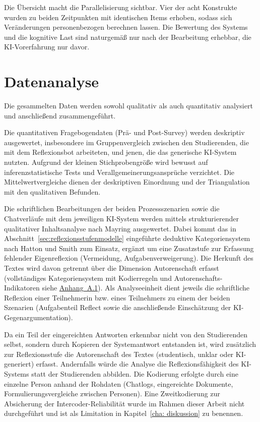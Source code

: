 Die Übersicht macht die Parallelisierung sichtbar. Vier der acht Konstrukte wurden zu beiden
Zeitpunkten mit identischen Items erhoben, sodass sich Veränderungen personenbezogen berechnen
lassen. Die Bewertung des Systems und die kognitive Last sind naturgemäß nur nach der Bearbeitung
erhebbar, die KI-Vorerfahrung nur davor.

\newpage
\section{Datenanalyse}
\label{sec:datenanalyse}
Die gesammelten Daten werden sowohl qualitativ als auch quantitativ analysiert und anschließend
zusammengeführt.

Die quantitativen Fragebogendaten (Prä- und Post-Survey) werden deskriptiv ausgewertet, insbesondere
im Gruppenvergleich zwischen den Studierenden, die mit dem Reflexionsbot arbeiteten, und jenen, die
das generische KI-System nutzten. Aufgrund der kleinen Stichprobengröße wird bewusst auf
inferenzstatistische Tests und Verallgemeinerungsansprüche verzichtet. Die Mittelwertvergleiche dienen
der deskriptiven Einordnung und der Triangulation mit den qualitativen Befunden.

Die schriftlichen Bearbeitungen der beiden Prozessszenarien sowie die Chatverläufe mit dem jeweiligen
KI-System werden mittels strukturierender qualitativer Inhaltsanalyse nach Mayring
\cite{mayringQualitativeInhaltsanalyse2019} ausgewertet. Dabei kommt das in
Abschnitt~\ref{sec:reflexionsstufenmodelle} eingeführte deduktive Kategoriensystem nach Hatton und
Smith \cite{hattonSmithReflectionTeacherEducation1995} zum Einsatz, ergänzt um eine Zusatzstufe zur
Erfassung fehlender Eigenreflexion (Vermeidung, Aufgabenverweigerung). Die Herkunft des Textes wird
davon getrennt über die Dimension Autorenschaft erfasst (vollständiges Kategoriensystem mit
Kodierregeln und Autorenschafts-Indikatoren siehe \hyperref[app:kategoriensystem]{Anhang~A.1}). Als Analyseeinheit dient jeweils die
schriftliche Reflexion einer Teilnehmerin bzw. eines Teilnehmers zu einem der beiden Szenarien
(Aufgabenteil \glqq Reflect\grqq{} sowie die anschließende Einschätzung der KI-Gegenargumentation).

Da ein Teil der eingereichten Antworten erkennbar nicht von den Studierenden selbst, sondern durch
Kopieren der Systemantwort entstanden ist, wird zusätzlich zur Reflexionsstufe die Autorenschaft des
Textes (studentisch, unklar oder KI-generiert) erfasst. Andernfalls würde die Analyse die
Reflexionsfähigkeit des KI-Systems statt der Studierenden abbilden. Die Kodierung erfolgte durch eine
einzelne Person anhand der Rohdaten (Chatlogs, eingereichte Dokumente, Formulierungsvergleiche
zwischen Personen). Eine Zweitkodierung zur Absicherung der Intercoder-Reliabilität wurde im Rahmen
dieser Arbeit nicht durchgeführt und ist als Limitation in Kapitel~\ref{cha: diskussion} zu benennen.

